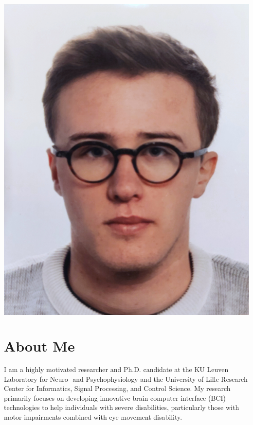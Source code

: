 \documentclass[10pt,a4paper]{article}
\begin{document}
\begin{minipage}[b]{.29\linewidth}
	\includegraphics[width=\linewidth]{photo.jpg}
\end{minipage}


\section*{About Me}


I am a highly motivated researcher and Ph.D. candidate at the KU Leuven Laboratory for Neuro- and Psychophysiology and the University of Lille Research Center for Informatics, Signal Processing, and Control Science. My research primarily focuses on developing innovative brain-computer interface (BCI) technologies to help individuals with severe disabilities, particularly those with motor impairments combined with eye movement disability.
\end{document}
